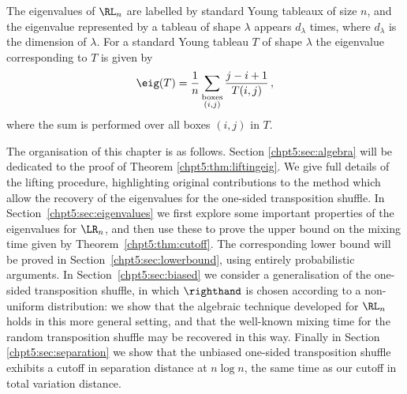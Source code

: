 \documentclass[11pt]{report}
\begin{document}
\begin{thm}
	\label{chpt5:thm:liftingeig}
	The eigenvalues of $\RL_{n}$ are labelled by standard Young tableaux of 
	size $n$, and the eigenvalue represented by a tableau of shape 
	$\lambda$ appears 
	$d_{\lambda}$ times, where $d_\lambda$ is the dimension of $\lambda$.	For a standard Young tableau $T$ of shape $\lambda$ the eigenvalue 
	corresponding to 
	$T$ is given by
	\begin{eqnarray}
	\label{eigenvaluesum}
	\eig(T) = \frac{1}{n}\sum_{\substack{\textnormal{boxes}\\ (i,j)}} 
	\frac{j-i+1}{T(i,j)}\,,
	\end{eqnarray}
	where the sum is performed over all boxes $(i,j)$ in $T$.
\end{thm}

The organisation of this chapter is as follows.
Section \ref{chpt5:sec:algebra} will be dedicated to the proof of Theorem 
\ref{chpt5:thm:liftingeig}. We give full details of the lifting 
procedure, highlighting original contributions to the method which 
allow the recovery of the eigenvalues for the one-sided transposition shuffle. In 
Section~\ref{chpt5:sec:eigenvalues} we first explore some important 
properties of 
the eigenvalues for $\LR_{n}$,  and then  use these to prove the upper 
bound on the mixing time given by Theorem~\ref{chpt5:thm:cutoff}. The 
corresponding lower bound will be proved in Section~\ref{chpt5:sec:lowerbound}, using 
entirely probabilistic arguments. In Section~\ref{chpt5:sec:biased} 
we  consider a generalisation of the one-sided transposition shuffle, in 
which 
$\righthand$ is chosen according to a non-uniform distribution: we show 
that the 
algebraic technique developed for $\RL_{n}$ holds in this more general 
setting, and that the well-known mixing time for the random 
transposition shuffle may be recovered in this way. Finally in Section \ref{chpt5:sec:separation} we show that the unbiased one-sided transposition shuffle exhibits a cutoff in separation distance at $n\log n$, the same time as our cutoff in total variation distance. 
\end{document}

